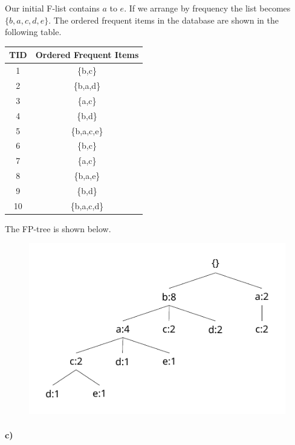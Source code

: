 \documentclass[12pt]{article}
\begin{document}
Our initial F-list contains \(a\) to \(e\). If we arrange by frequency the list becomes \(\{b,a,c,d,e\}\). The ordered
frequent items in the database are shown in the following table.
\begin{center}
    \begin{tabular}{c|c}
        TID & Ordered Frequent Items\\
        \hline
        1 & \{b,c\}\\
        2 & \{b,a,d\}\\
        3 & \{a,c\}\\
        4 & \{b,d\}\\
        5 & \{b,a,c,e\}\\
        6 & \{b,c\}\\
        7 & \{a,c\}\\
        8 & \{b,a,e\}\\
        9 & \{b,d\}\\
        10 & \{b,a,c,d\}
    \end{tabular}
\end{center}
The FP-tree is shown below.
\begin{figure}[H]
    \begin{center}
        \includegraphics[width=4.5in]{problem1b.pdf}
    \end{center}
\end{figure}

\paragraph{c)}
\end{document}
